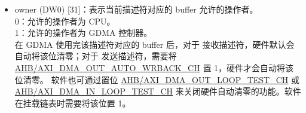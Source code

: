 \documentclass[main\_\_CN.tex]{subfiles}
\begin{document}
\begin{itemize}
    \item owner (DW0) [31]：表示当前描述符对应的 buffer 允许的操作者。\\
    0：允许的操作者为 CPU。\\
    1：允许的操作者为 GDMA 控制器。\\
    在 GDMA 使用完该描述符对应的 buffer 后，对于 接收描述符，硬件默认会自动将该位清零；对于 发送描述符，需要将 \hyperref[fielddesc:AHBDMAOUTAUTOWRBACKCHN]{AHB/AXI\_DMA\_OUT\_AUTO\_WRBACK\_CH} 置 1，硬件才会自动将该位清零。 软件也可通过置位 \hyperref[fielddesc:AHBDMAOUTLOOPTESTCHN]{AHB/AXI\_DMA\_OUT\_LOOP\_TEST\_CH} 或 \hyperref[fielddesc:AHBDMAINLOOPTESTCHN]{AHB/AXI\_DMA\_IN\_LOOP\_TEST\_CH} 来关闭硬件自动清零的功能。软件在挂载链表时需要将该位置 1。


\end{itemize}
\end{document}
